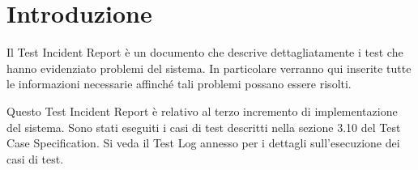 \chapter{Introduzione}
Il Test Incident Report è un documento che descrive dettagliatamente i test che hanno evidenziato problemi del sistema. In particolare verranno qui inserite tutte le informazioni necessarie affinché tali problemi possano essere risolti.

Questo Test Incident Report è relativo al terzo incremento di implementazione del sistema. Sono stati eseguiti i casi di test descritti nella sezione 3.10 del Test Case Specification. Si veda il Test Log annesso per i dettagli sull'esecuzione dei casi di test.